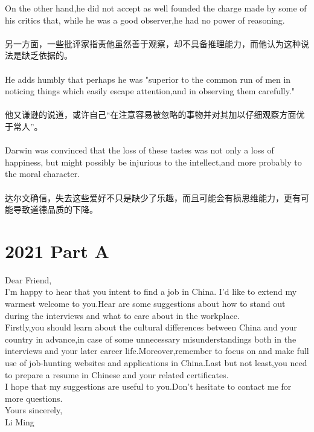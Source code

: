 \documentclass[UTF8]{article}
\begin{document}
    On the other hand,he did not accept as well founded the charge made by some of his critics that,
    while he was a good observer,he had no power of reasoning.\\
    \\
    另一方面，一些批评家指责他虽然善于观察，却不具备推理能力，而他认为这种说法是缺乏依据的。\\
    \\

    He adds humbly that perhaps he was "superior to the common run of men in noticing things which easily 
    escape attention,and in observing them carefully."\\
    \\
    他又谦逊的说道，或许自己“在注意容易被忽略的事物并对其加以仔细观察方面优于常人”。\\
    \\

    Darwin was convinced that the loss of these tastes was not only a loss of happiness,
    but might possibly be injurious to the intellect,and more probably to the moral character.\\
    \\
    达尔文确信，失去这些爱好不只是缺少了乐趣，而且可能会有损思维能力，更有可能导致道德品质的下降。
    \section*{2021 Part A}
    Dear Friend,\\
    I'm happy to hear that you intent to find a job in China.
    I'd like to extend my warmest welcome to you.Hear are some suggestions 
    about how to stand out during the interviews and what to care about in the workplace.\\
    Firstly,you should learn about the cultural differences between China and your country in 
    advance,in case of some unnecessary misunderstandings both in the interviews and your later 
    career life.Moreover,remember to focus on and make full use of job-hunting websites and 
    applications in China.Last but not least,you need to prepare a resume in Chinese and 
    your related certificates.\\
    I hope that my suggestions are useful to you.Don't hesitate to contact me for more questions.\\
    Yours sincerely,\\
    Li Ming\\
    
\end{document}
